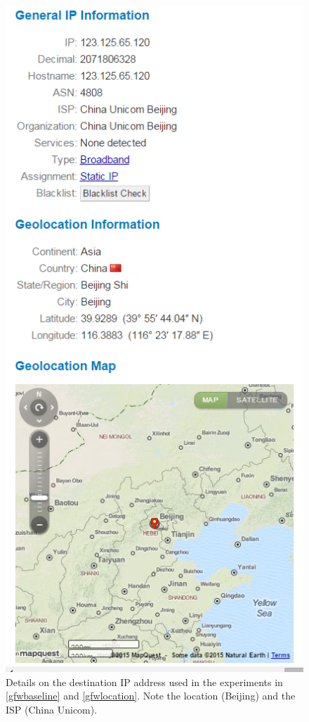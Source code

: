 \begin{figure}
	\includegraphics[width=\columnwidth]{figures/gfwbaiduip}
	\caption{
		\cite{IPLookup120} Details on the destination IP address used in the experiments in \autoref{gfwbaseline} and \autoref{gfwlocation}.
		Note the location (Beijing) and the ISP (China Unicom).
	}
	\label{fig_gfwbaiduip}
\end{figure}

